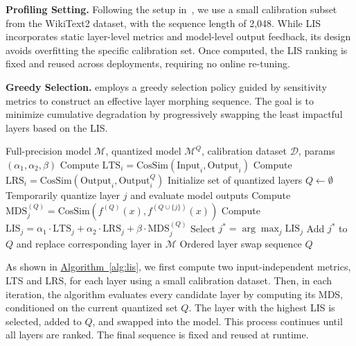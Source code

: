 \noindent\textbf{Profiling Setting.}
Following the setup in~\cite{lin2024duquant, shao2023omniquant, ma2024affinequant}, we use a small calibration subset from the WikiText2 dataset, with the sequence length of 2,048. While LIS incorporates static layer-level metrics and model-level output feedback, its design avoids overfitting the specific calibration set. Once computed, the LIS ranking is fixed and reused across deployments, requiring no online re-tuning.

\noindent\textbf{Greedy Selection.}
{\system} employs a greedy selection policy guided by sensitivity metrics to construct an effective layer morphing sequence. The goal is to minimize cumulative degradation by progressively swapping the least impactful layers based on the LIS. 

\begin{algorithm}[t]
\caption{Swapping Sequence Profiling Based on Layer Importance Scoring (LIS)}
\label{alg:lis}
\begin{algorithmic}[1]
\Require Full-precision model $\mathcal{M}$, quantized model $\mathcal{M}^Q$, calibration dataset $\mathcal{D}$, params $(\alpha_1, \alpha_2, \beta)$
    \State Compute $\text{LTS}_i = \text{CosSim}(\text{Input}_i, \text{Output}_i)$
    \State Compute $\text{LRS}_i = \text{CosSim}(\text{Output}_i, \text{Output}_i^Q)$
\EndFor
\State Initialize set of quantized layers $Q \gets \emptyset$
        \State Temporarily quantize layer $j$ and evaluate model outputs
        \State Compute $\text{MDS}_j^{(Q)} = \text{CosSim}(f^{(Q)}(x), f^{(Q \cup \{j\})}(x))$
        \State Compute $\text{LIS}_j = \alpha_1 \cdot \text{LTS}_j + \alpha_2 \cdot \text{LRS}_j + \beta \cdot \text{MDS}_j^{(Q)}$
    \EndFor
    \State Select $j^* = \arg\max_j \text{LIS}_j$
    \State Add $j^*$ to $Q$ and replace corresponding layer in $\mathcal{M}$
\EndFor
\Return Ordered layer swap sequence $Q$
\end{algorithmic}
\end{algorithm}

As shown in \hyperref[alg:lis]{Algorithm~\ref{alg:lis}}, we first compute two input-independent metrics, LTS and LRS, for each layer using a small calibration dataset. Then, in each iteration, the algorithm evaluates every candidate layer by computing its MDS, conditioned on the current quantized set $Q$. The layer with the highest LIS is selected, added to $Q$, and swapped into the model. This process continues until all layers are ranked. 
The final sequence is fixed and reused at runtime.

